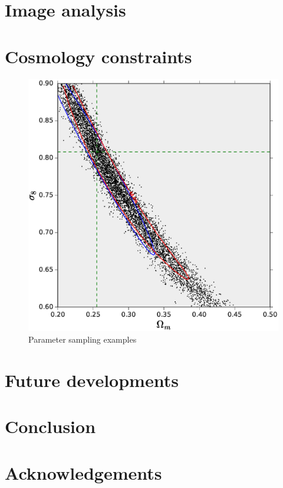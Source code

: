 \documentclass[reprint,aps,prd,superscriptaddress,showkeys,showpacs]{revtex4-1}
\begin{document}

\section{Image analysis}


\section{Cosmology constraints}

\begin{figure}
\includegraphics[scale=0.4]{Figures/parameter_sampling.eps}
\caption{Parameter sampling examples}
\label{samplingfig}
\end{figure}


\section{Future developments}


\section{Conclusion}

 

\section*{Acknowledgements}



\label{lastpage}
\end{document}
